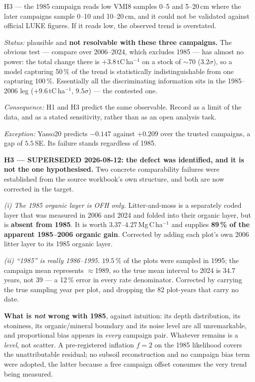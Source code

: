 \documentclass[11pt]{article}
\begin{document}
\begin{hyp}{H3 --- the 1985 campaign reads low}
VMI8 samples 0--5 and 5--20\,cm where the later campaigns sample 0--10 and 10--20\,cm, and it
could not be validated against official LUKE figures. If it reads low, the observed trend is
overstated.

\emph{Status:} plausible and \textbf{not resolvable with these three campaigns.} The obvious test
--- compare over 2006--2024, which excludes 1985 --- has almost no power: the total change there is
$+3.8$\,tC\,ha$^{-1}$ on a stock of $\sim$70 ($3.2\sigma$), so a model capturing 50\,\% of the
trend is statistically indistinguishable from one capturing 100\,\%. Essentially all the
discriminating information sits in the 1985--2006 leg ($+9.6$\,tC\,ha$^{-1}$, $9.5\sigma$) --- the
contested one.

\emph{Consequence:} H1 and H3 predict the same observable. Record as a limit of the data, and as a
stated sensitivity, rather than as an open analysis task.

\emph{Exception:} Yasso20 predicts $-0.147$ against $+0.209$ over the trusted campaigns, a gap of
$5.5$\,SE. Its failure stands regardless of 1985.
\end{hyp}

\begin{caveat}
\textbf{H3 --- SUPERSEDED 2026-08-12: the defect was identified, and it is not the one hypothesised.}
Two concrete comparability failures were established from the source workbook's own structure, and
both are now corrected in the target.

\smallskip
\emph{(i) The 1985 organic layer is OFH only.} Litter-and-moss is a separately coded layer that was
measured in 2006 and 2024 and folded into their organic layer, but is \textbf{absent from 1985}. It
is worth $3.37$--$4.27$\,Mg\,C\,ha$^{-1}$ and supplies \textbf{89\,\% of the apparent 1985--2006
organic gain}. Corrected by adding each plot's own 2006 litter layer to its 1985 organic layer.

\smallskip
\emph{(ii) ``1985'' is really 1986--1995.} $19.5$\,\% of the plots were sampled in 1995; the campaign
mean represents $\approx$1989, so the true mean interval to 2024 is $34.7$ years, not $39$ --- a
12\,\% error in every rate denominator. Corrected by carrying the true sampling year per plot, and
dropping the 82 plot-years that carry no date.

\smallskip
\textbf{What is \emph{not} wrong with 1985}, against intuition: its depth distribution, its
stoniness, its organic/mineral boundary and its noise level are all unremarkable, and proportional
bias appears in \emph{every} campaign pair. Whatever remains is a \emph{level}, not scatter. A
pre-registered inflation $f=2$ on the 1985 likelihood covers the unattributable residual; no subsoil
reconstruction and no campaign bias term were adopted, the latter because a free campaign offset
consumes the very trend being measured.
\end{caveat}
\end{document}
